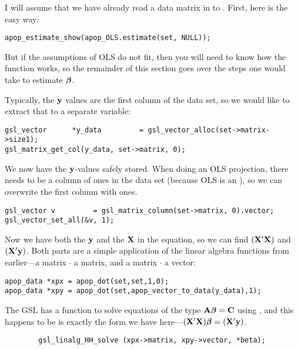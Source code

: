 I will assume that we have already read a data matrix in to . First, here is the easy way:
\begin{lstlisting}
apop_estimate_show(apop_OLS.estimate(set, NULL));
\end{lstlisting}


But if the assumptions of OLS do not fit, then you will need to know how
the  function works, so the remainder of this
section goes over the steps one would take to estimate ${\mbox{\boldmath$\beta$}}$.  

Typically, the ${\bf y}$
values are the first column of the data set, so we would like to extract that to a separate variable:
\begin{lstlisting}
gsl_vector      *y_data         = gsl_vector_alloc(set->matrix->size1);
gsl_matrix_get_col(y_data, set->matrix, 0);
\end{lstlisting}

We now have the ${\bf y}$-values safely stored.  When doing an OLS projection,
there needs to be a column of ones in the data set (because OLS is an
), so we can overwrite the first column
with ones. 
\begin{lstlisting}
gsl_vector v         = gsl_matrix_column(set->matrix, 0).vector;
gsl_vector_set_all(&v, 1);  
\end{lstlisting}


Now we have both the ${\bf y}$ and the ${\bf X}$ in the equation, so we can find $({\bf X}'{\bf X})$ and $({\bf X}'{\bf y})$.
Both parts are a
simple application of the linear algebra functions from earlier---a matrix $\cdot$ a matrix, and a matrix $\cdot$ a vector:
\begin{lstlisting}
apop_data *xpx = apop_dot(set,set,1,0);
apop_data *xpy = apop_dot(set,apop_vector_to_data(y_data),1);
\end{lstlisting}

The GSL has a function to solve equations of the type ${\bf A} {\mbox{\boldmath$\beta$}} =
{\bf C}$ using , and this happens to be is exactly the form we have here---$({\bf X}'{\bf X}){\mbox{\boldmath$\beta$}} = ({\bf X}'{\bf y})$.  \label{ols}
\begin{lstlisting}
        gsl_linalg_HH_solve (xpx->matrix, xpy->vector, *beta);
\end{lstlisting}

